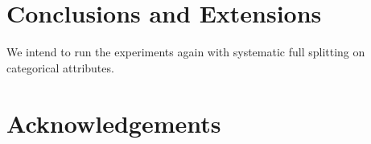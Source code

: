 \documentclass{article}
\begin{document}


\section{Conclusions and Extensions}
\label{sec:conclusions}

We intend to run the experiments again with systematic full splitting on categorical attributes.



\section{Acknowledgements}
\label{sec:conclusions}





\end{document}
